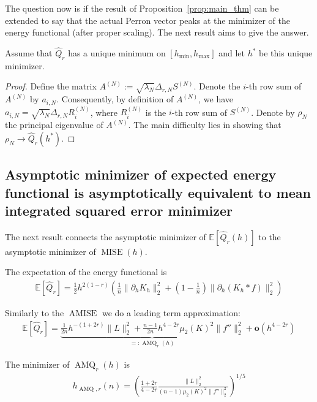 The question now is if the result of Proposition~\ref{prop:main_thm} can be extended to say that the actual Perron vector peaks at the minimizer of the energy functional (after proper scaling). The next result aims to give the answer.


\begin{Prop}
    Assume that $\hat{Q}_r$ has a unique minimum on $[h_{\min},h_{\max}]$ and let $h^{\ast}$ be this unique minimizer.
\end{Prop}

\begin{proof}
    Define the matrix $A^{(N)}:=\sqrt{\lambda_N}\Delta_{r,N}S^{(N)}$. Denote the $i$-th row sum of $A^{(N)}$ by $a_{i,N}$. Consequently, by definition of $A^{(N)}$, we have $a_{i,N}=\sqrt{\lambda_N}\Delta_{r,N}R_{i}^{(N)}$, where $R_{i}^{(N)}$ is the $i$-th row sum of $S^{(N)}$. Denote by $\rho_N$ the principal eigenvalue of $A^{(N)}$. The main difficulty lies in showing that $\rho_N\to\hat{Q}_r(h^{\ast})$.
\end{proof}

\subsection{Asymptotic minimizer of expected energy functional is asymptotically equivalent to mean integrated squared error minimizer}

The next result connects the asymptotic minimizer of $\mathbb{E}[\hat{Q}_r(h)]$ to the asymptotic minimizer of $\operatorname{MISE}(h)$.

The expectation of the energy functional is
\begin{align*}
    \mathbb{E}[\hat{Q}_r]=\frac{1}{2}h^{2(1-r)}\left(\frac{1}{n}\|\partial_hK_h\|_2^2+\left(1-\frac{1}{n}\right)\|\partial_h(K_h\ast f)\|_2^2\right)
\end{align*}

Similarly to the $\operatorname{AMISE}$ we do a leading term approximation:
\begin{align*}
    \mathbb{E}[\hat{Q}_r]=\underbrace{\frac{1}{2n}h^{-(1+2r)}\|L\|_2^2+\frac{n-1}{2n}h^{4-2r}\mu_2(K)^2\|f''\|_2^2}_{=:\operatorname{AMQ}_r(h)}+\mathbf{o}(h^{4-2r})
\end{align*}

The minimizer of $\operatorname{AMQ}_r(h)$ is
\begin{align*}
    h_{\operatorname{AMQ},r}(n)=\left(\frac{1+2r}{4-2r}\frac{\|L\|_2^2}{(n-1)\mu_2(K)^2\|f''\|_2^2}\right)^{1/5}
\end{align*}

